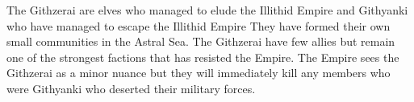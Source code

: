 The Githzerai are elves who managed to elude the Illithid Empire and Githyanki who have managed to escape the Illithid Empire
They have formed their own small communities in the Astral Sea.
The Githzerai have few allies but remain one of the strongest factions that has resisted the Empire.
The Empire sees the Githzerai as a minor nuance but they will immediately kill any members who were Githyanki who deserted their military forces.

